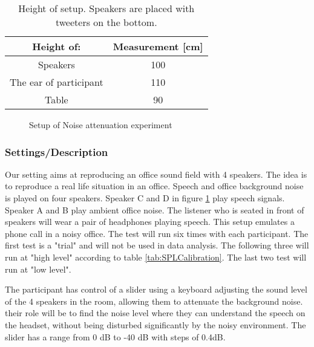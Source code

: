 \begin{table} [h]
	\centering
	\begin{tabular}{c c} \toprule
		\centering
		Height of:			 			& Measurement [cm] 	\\ \bottomrule
		Speakers					  	& 100				\\
		The ear of participant			& 110				\\ 
		Table							& 90				\\ \bottomrule 
	\end{tabular}
	\caption{Height of setup. Speakers are placed with tweeters on the bottom.}
	\label{Tab:NoiseAttenuationDimensions}
\end{table}


\begin{figure}[H]
	\centering
	
	\caption{Setup of Noise attenuation experiment}
	\label{Fig:NoiseAttenuationExperimet}
\end{figure}


\subsubsection{Settings/Description}
Our setting aims at reproducing an office sound field with 4 speakers. 
The idea is to reproduce a real life situation in an office. Speech and office background noise is played on four speakers. Speaker C and D in figure \ref{Fig:NoiseAttenuationExperimet} play speech signals. Speaker A and B play ambient office noise. The listener who is seated in front of speakers will wear a pair of headphones playing speech. This setup emulates a phone call in a noisy office. The test will run six times with each participant. The first test is a "trial" and will not be used in data analysis. The following three will run at "high level" according to table \ref{tab:SPLCalibration}. The last two test will run at "low level". 

The participant has control of a slider using a keyboard adjusting the sound level of the 4 speakers in the room, allowing them to attenuate the background noise. their role will be to find the noise level where they can understand the speech on the headset, without being disturbed significantly by the noisy environment. The slider has a range from 0 dB to -40 dB with steps of 0.4dB. 

